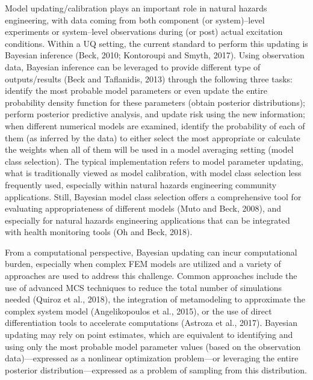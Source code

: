 Model updating/calibration plays an important role in natural hazards engineering, with data coming from both component (or system)–level experiments or system–level observations during (or post) actual excitation conditions. Within a UQ setting, the current standard to perform this updating is Bayesian inference (Beck, 2010; Kontoroupi and Smyth, 2017). Using observation data, Bayesian inference can be leveraged to provide different type of outputs/results (Beck and Taflanidis, 2013) through the following three tasks: identify the most probable model parameters or even update the entire probability density function for these parameters (obtain posterior distributions); perform posterior predictive analysis, and update risk using the new information; when different numerical models are examined, identify the probability of each of them (as inferred by the data) to either select the most appropriate or calculate the weights when all of them will be used in a model averaging setting (model class selection). The typical implementation refers to model parameter updating, what is traditionally viewed as model calibration, with model class selection less frequently used, especially within natural hazards engineering community applications. Still, Bayesian model class selection offers a comprehensive tool for evaluating appropriateness of different models (Muto and Beck, 2008), and especially for natural hazards engineering applications that can be integrated with health monitoring tools (Oh and Beck, 2018).

From a computational perspective, Bayesian updating can incur computational burden, especially when complex FEM models are utilized and a variety of approaches are used to address this challenge. Common approaches include the use of advanced MCS techniques to reduce the total number of simulations needed (Quiroz et al., 2018), the integration of metamodeling to approximate the complex system model (Angelikopoulos et al., 2015), or the use of direct differentiation tools to accelerate computations (Astroza et al., 2017). Bayesian updating may rely on point estimates, which are equivalent to identifying and using only the most probable  model parameter values (based on the observation data)—expressed as a nonlinear optimization problem—or leveraging the entire posterior distribution—expressed as a problem of sampling from this distribution.

